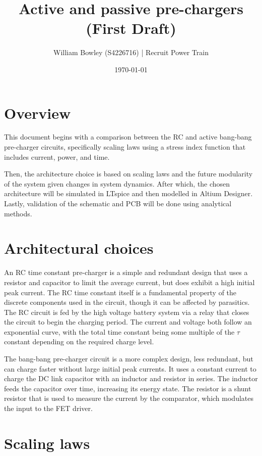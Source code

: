 \documentclass{article}
\title{Active and passive pre-chargers (First Draft)}
\author{William Bowley (S4226716) | Recruit Power Train}
\date{\today}
\begin{document}
\maketitle

\section{Overview}
This document begins with a comparison between the RC and active bang-bang pre-charger circuits, specifically scaling laws using a stress index function that includes current, power, and time.

\vspace{0.5cm}
Then, the architecture choice is based on scaling laws and the future modularity of the system given changes in system dynamics. After which, the chosen architecture will be simulated in 
LTspice and then modelled in Altium Designer. Lastly, validation of the schematic and PCB will be done using analytical methods.

\section{Architectural choices}
An RC time constant pre-charger is a simple and redundant design that uses a resistor and capacitor to limit the average current, but does exhibit a high initial peak current. The RC 
time constant itself is a fundamental property of the discrete components used in the circuit, though it can be affected by parasitics. The RC circuit is fed by the high voltage battery 
system via a relay that closes the circuit to begin the charging period. The current and voltage both follow an exponential curve, with the total time constant being some multiple of the 
$\tau$ constant depending on the required charge level.

\vspace{0.75cm}
The bang-bang pre-charger circuit is a more complex design, less redundant, but can charge faster without large initial peak currents. It uses a constant current to charge the DC link capacitor
 with an inductor and resistor in series. The inductor feeds the capacitor over time, increasing its energy state. The resistor is a shunt resistor that is used to measure the current by the comparator, 
 which modulates the input to the FET driver.

\section{Scaling laws}
\end{document}
